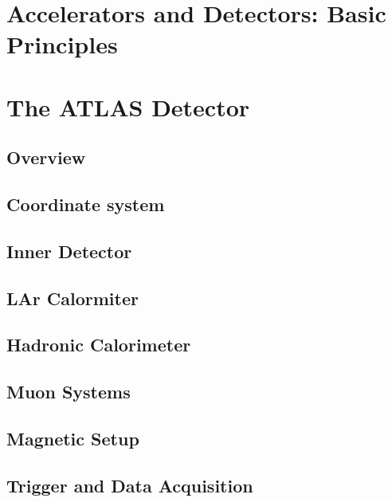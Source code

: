 
\section{Accelerators and Detectors: Basic Principles}

\section{The ATLAS Detector}
\subsection{Overview}
\subsection{Coordinate system}
\subsection{Inner Detector}
\subsection{LAr Calormiter}
\subsection{Hadronic Calorimeter}
\subsection{Muon Systems}
\subsection{Magnetic Setup}
\subsection{Trigger and Data Acquisition}



